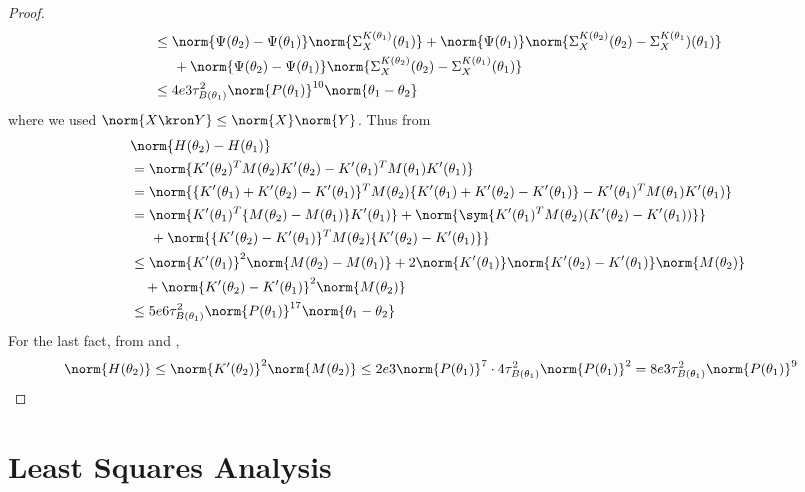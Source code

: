 \begin{proof}
\begin{align*}
        &\leq \norm{\Psi(\theta_2) - \Psi(\theta_1)}\norm{\Sigma_X^{K(\theta_1)}(\theta_1)} + \norm{\Psi(\theta_1)}\norm{\Sigma_X^{K(\theta_2)}(\theta_2) - \Sigma_X^{K(\theta_1})(\theta_1)} \\
        &\hspace{5mm}+ \norm{\Psi(\theta_2) - \Psi(\theta_1)}\norm{\Sigma_X^{K(\theta_2)}(\theta_2) - \Sigma_X^{K(\theta_1)}(\theta_1)} \\
        &\leq 4e3\tau_{B(\theta_1)}^2\norm{P(\theta_1)}^{10}\norm{\theta_1-\theta_2}
    \end{align*}
    where we used $\norm{X\kron Y}\leq\norm{X}\norm{Y}$.
    Thus from 
    \begin{align*}
        &\norm{H(\theta_2) - H(\theta_1)} \\
        &= \norm{K'(\theta_2)^TM(\theta_2)K'(\theta_2) - K'(\theta_1)^TM(\theta_1)K'(\theta_1)} \\
        &= \norm{\{K'(\theta_1) + K'(\theta_2) - K'(\theta_1)\}^TM(\theta_2)\{K'(\theta_1) + K'(\theta_2) - K'(\theta_1)\} -K'(\theta_1)^TM(\theta_1)K'(\theta_1)} \\
        &= \norm{K'(\theta_1)^T\{M(\theta_2) - M(\theta_1)\}K'(\theta_1)} + \norm{\sym\{K'(\theta_1)^TM(\theta_2)(K'(\theta_2) - K'(\theta_1))\}} \\
        &\hspace{5mm} + \norm{\{K'(\theta_2) - K'(\theta_1)\}^TM(\theta_2)\{K'(\theta_2) - K'(\theta_1)\}} \\
        &\leq \norm{K'(\theta_1)}^2\norm{M(\theta_2)-M(\theta_1)} + 2\norm{K'(\theta_1)}\norm{K'(\theta_2) - K'(\theta_1)}\norm{M(\theta_2)} \\
        &\quad + \norm{K'(\theta_2) - K'(\theta_1)}^2\norm{M(\theta_2)} \\
        &\leq 5e6\tau_{B(\theta_1)}^2\norm{P(\theta_1)}^{17}\norm{\theta_1-\theta_2}
    \end{align*}
    For the last fact, from  and , 
    \begin{align*}
        \norm{H(\theta_2)} &\leq \norm{K'(\theta_2)}^2\norm{M(\theta_2)} 
        \leq 2e3\norm{P(\theta_1)}^7\cdot4\tau^2_{B(\theta_1)}\norm{P(\theta_1)}^2 = 8e3\tau^2_{B(\theta_1)}\norm{P(\theta_1)}^9
    \end{align*}
\end{proof}



\section{Least Squares Analysis}
\label{s: id bound proof}

